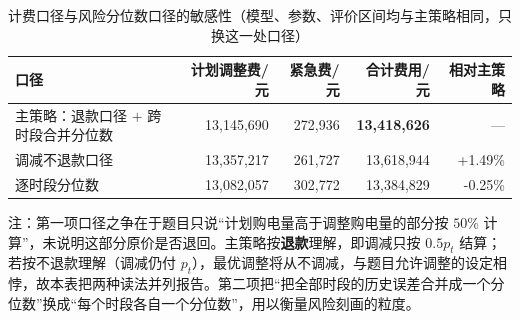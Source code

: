 \begin{table}[htbp]
  \centering
  \caption{计费口径与风险分位数口径的敏感性（模型、参数、评价区间均与主策略相同，只换这一处口径）}
  \label{tab:p3-billing}
  \footnotesize
  \begin{tabular}{lrrrr}
    \toprule
    口径 & 计划调整费/元 & 紧急费/元 & 合计费用/元 & 相对主策略 \\
    \midrule
    主策略：退款口径 $+$ 跨时段合并分位数 & 13,145,690 & 272,936 & \textbf{13,418,626} & --- \\
    调减不退款口径 & 13,357,217 & 261,727 & 13,618,944 & +1.49\% \\
    逐时段分位数 & 13,082,057 & 302,772 & 13,384,829 & -0.25\% \\
    \bottomrule
  \end{tabular}
  \par\vspace{2pt}
  \begin{minipage}{.92\textwidth}\footnotesize
    注：第一项口径之争在于题目只说“计划购电量高于调整购电量的部分按 $50\%$ 计算”，未说明这部分原价是否退回。主策略按\textbf{退款}理解，即调减只按 $0.5p_t$ 结算；若按不退款理解（调减仍付 $p_t$），最优调整将从不调减，与题目允许调整的设定相悖，故本表把两种读法并列报告。第二项把“把全部时段的历史误差合并成一个分位数”换成“每个时段各自一个分位数”，用以衡量风险刻画的粒度。
  \end{minipage}
\end{table}

